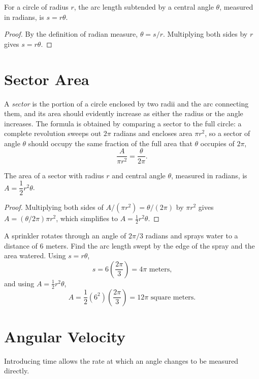 \begin{theorem}
For a circle of radius $r$, the arc length subtended by a central angle
$\theta$, measured in radians, is $s = r\theta$.
\end{theorem}

\begin{proof}
By the definition of radian measure, $\theta = s/r$. Multiplying both sides
by $r$ gives $s = r\theta$.
\end{proof}

\section{Sector Area}

A \emph{sector} is the portion of a circle enclosed by two radii and the arc
connecting them, and its area should evidently increase as either the
radius or the angle increases. The formula is obtained by comparing a
sector to the full circle: a complete revolution sweeps out $2\pi$ radians
and encloses area $\pi r^2$, so a sector of angle $\theta$ should occupy the
same fraction of the full area that $\theta$ occupies of $2\pi$,
\[
\frac{A}{\pi r^2} = \frac{\theta}{2\pi}.
\]

\begin{theorem}
The area of a sector with radius $r$ and central angle $\theta$, measured in
radians, is $A = \dfrac12 r^2 \theta$.
\end{theorem}

\begin{proof}
Multiplying both sides of $A/(\pi r^2) = \theta/(2\pi)$ by $\pi r^2$ gives
$A = (\theta/2\pi)\pi r^2$, which simplifies to $A = \tfrac12 r^2\theta$.
\end{proof}

\begin{example}
A sprinkler rotates through an angle of $2\pi/3$ radians and sprays water
to a distance of $6$ meters. Find the arc length swept by the edge of the
spray and the area watered. Using $s = r\theta$,
\[
s = 6\left(\frac{2\pi}{3}\right) = 4\pi \text{ meters,}
\]
and using $A = \tfrac12 r^2\theta$,
\[
A = \frac12 (6^2)\left(\frac{2\pi}{3}\right) = 12\pi \text{ square meters.}
\]
\end{example}

\section{Angular Velocity}

Introducing time allows the rate at which an angle changes to be measured
directly.

